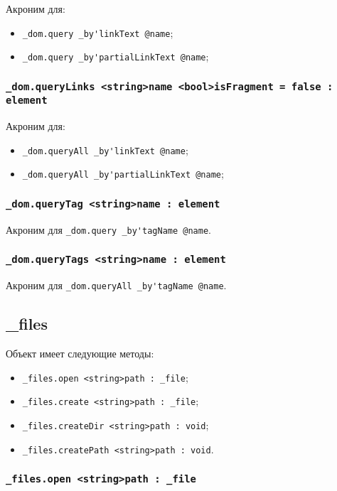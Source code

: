 \documentclass[a4paper, 14pt]{extarticle}
\newenvironment{icItems}
	{ \begin{itemize} [noitemsep,nolistsep] }
	{ \end{itemize} }
\begin{document}
Акроним для:
\begin{icItems}
	\item \lstinline|_dom.query _by'linkText @name|;
	\item \lstinline|_dom.query _by'partialLinkText @name|;
\end{icItems}

\subsubsection{\lstinline|_dom.queryLinks <string>name <bool>isFragment = false : element|}

Акроним для:
\begin{icItems}
	\item \lstinline|_dom.queryAll _by'linkText @name|;
	\item \lstinline|_dom.queryAll _by'partialLinkText @name|;
\end{icItems}

\subsubsection{\lstinline|_dom.queryTag <string>name : element|}

Акроним для \lstinline|_dom.query _by'tagName @name|.

\subsubsection{\lstinline|_dom.queryTags <string>name : element|}

Акроним для \lstinline|_dom.queryAll _by'tagName @name|.

\subsection{{\color{orange} \_files}}

Объект \files{} имеет следующие методы:
\begin{icItems}
	\item \lstinline|_files.open <string>path : _file|;
	\item \lstinline|_files.create <string>path : _file|;
	\item \lstinline|_files.createDir <string>path : void|;
	\item \lstinline|_files.createPath <string>path : void|.
\end{icItems}

\subsubsection{\lstinline|_files.open <string>path : _file|}
\end{document}
